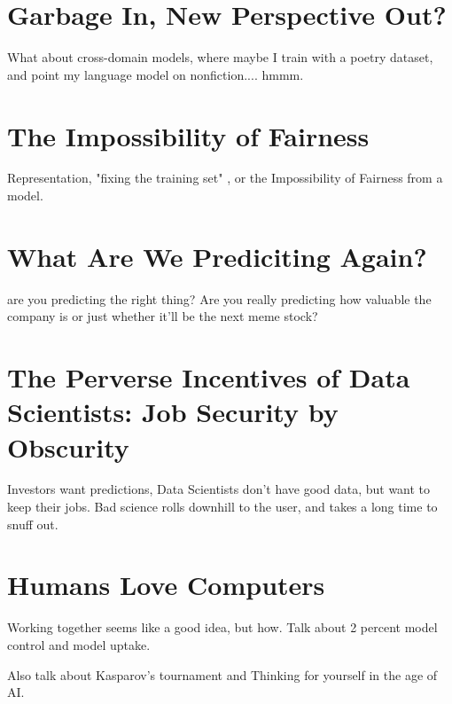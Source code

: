 \section{Garbage In, New Perspective Out?}

What about cross-domain models, where maybe I train with a poetry dataset, and point my language model on nonfiction.... hmmm.

\section{The Impossibility of Fairness}

Representation, "fixing the training set" , or the Impossibility of Fairness from a model.

\section{What Are We Prediciting Again?}

are you predicting the right thing? Are you really predicting how valuable the company is or just whether it'll be the next meme stock?

\section{The Perverse Incentives of Data Scientists: Job Security by Obscurity}

Investors want predictions, Data Scientists don't have good data, but want to keep their jobs. Bad science rolls downhill to the user, and takes a long time to snuff out. 

\section{Humans Love Computers}

Working together seems like a good idea, but how. Talk about 2 percent model control and model uptake. 

Also talk about Kasparov's tournament and Thinking for yourself in the age of AI. 


